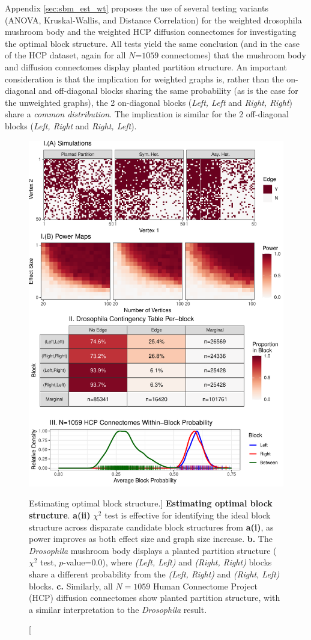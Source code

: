 Appendix \ref{sec:sbm_est_wt} proposes the use of several testing variants (ANOVA, Kruskal-Wallis, and Distance Correlation) for the weighted drosophila mushroom body and the weighted HCP diffusion connectomes for investigating the optimal block structure. All tests yield the same conclusion (and in the case of the HCP dataset, again for all $N$=$1059$ connectomes) that the mushroom body and diffusion connectomes display planted partition structure. An important consideration is that the implication for weighted graphs is, rather than the on-diagonal and off-diagonal blocks sharing the same probability (as is the case for the unweighted graphs), the 2 on-diagonal blocks (\textit{Left, Left} and \textit{Right, Right}) share a \textit{common distribution}. The implication is similar for the 2 off-diagonal blocks (\textit{Left, Right} and \textit{Right, Left}).

\begin{figure}
    \centering
    \includegraphics[width=.8\linewidth]{figures/dnd/sbm_uwt.pdf}
    \caption
    [Estimating optimal block structure.]
    {\textbf{Estimating optimal block structure}. \textbf{a(ii)} $\chi^2$ test is effective for identifying the ideal block structure across disparate candidate block structures from \textbf{a(i)}, as power improves as both effect size and graph size increase. \textbf{b.} The \textit{Drosophila} mushroom body displays a planted partition structure ($\chi^2$ test, $p$-value=$0.0$), where \textit{(Left, Left)} and \textit{(Right, Right)} blocks share a different probability from the \textit{(Left, Right)} and \textit{(Right, Left)} blocks. \textbf{c.} Similarly, all $N=1059$ Human Connectome Project (HCP) diffusion connectomes show planted partition structure, with a similar interpretation to the \textit{Drosophila} result.}
    \label{fig:sbm_uwt}
\end{figure}


